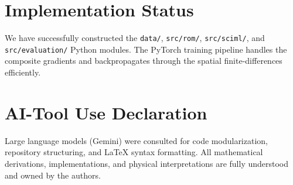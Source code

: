 \documentclass[11pt]{article}
\begin{document}
\section{Implementation Status}
We have successfully constructed the \texttt{data/}, \texttt{src/rom/}, \texttt{src/sciml/}, and \texttt{src/evaluation/} Python modules. The PyTorch training pipeline handles the composite gradients and backpropagates through the spatial finite-differences efficiently.

\section{AI-Tool Use Declaration}
Large language models (Gemini) were consulted for code modularization, repository structuring, and LaTeX syntax formatting. All mathematical derivations, implementations, and physical interpretations are fully understood and owned by the authors.
\end{document}
